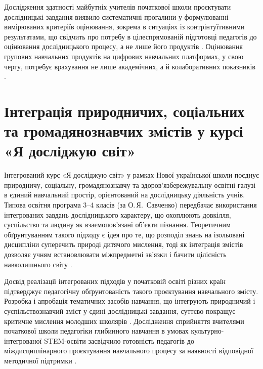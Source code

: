 \documentclass[a4paper,12pt]{article}
\begin{document}
Дослідження здатності майбутніх учителів початкової школи проєктувати дослідницькі завдання виявило систематичні прогалини у формулюванні вимірюваних критеріїв оцінювання, зокрема в ситуаціях із контрінтуїтивними результатами, що свідчить про потребу в цілеспрямованій підготовці педагогів до оцінювання дослідницького процесу, а не лише його продуктів \parencite{Lefkos2025349}. Оцінювання групових навчальних продуктів на цифрових навчальних платформах, у свою чергу, потребує врахування не лише академічних, а й колаборативних показників \parencite{Baziukė2025}.


\newpage


\section{Інтеграція природничих, соціальних та громадянознавчих змістів
         у курсі «Я досліджую світ»}

Інтегрований курс «Я досліджую світ» у рамках Нової української школи поєднує природничу, соціальну, громадянознавчу та здоров'язбережувальну освітні галузі в єдиний навчальний простір, орієнтований на дослідницьку діяльність учнів. Типова освітня програма 3--4 класів (за О.\,Я.~Савченко) передбачає використання інтегрованих завдань дослідницького характеру, що охоплюють довкілля, суспільство та людину як взаємопов'язані об'єкти пізнання. Теоретичним обґрунтуванням такого підходу є ідея про те, що розподіл знань на ізольовані дисципліни суперечить природі дитячого мислення, тоді як інтеграція змістів дозволяє учням встановлювати міжпредметні зв'язки і бачити цілісність навколишнього світу \parencite{Lehane20261}.

Досвід реалізації інтегрованих підходів у початковій освіті різних країн підтверджує педагогічну обґрунтованість такого проєктування навчального змісту. Розробка і апробація тематичних засобів навчання, що інтегрують природничий і суспільствознавчий зміст у єдині дослідницькі завдання, суттєво покращує критичне мислення молодших школярів \parencite{Sururuddin2026}. Дослідження сприйняття вчителями початкової школи педагогіки глибинного навчання в умовах культурно-інтегрованої STEM-освіти засвідчило готовність педагогів до міждисциплінарного проєктування навчального процесу за наявності відповідної методичної підтримки \parencite{Putri20251331}.
\end{document}
